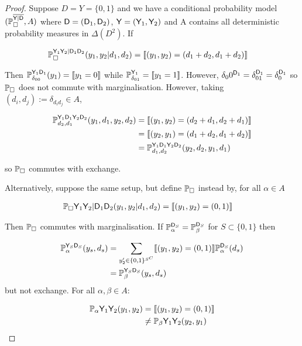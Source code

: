 \begin{proof}
Suppose $D=Y=\{0,1\}$ and we have a conditional probability model $(\mathbb{P}_\square^{\overline{\mathsf{Y}|\mathsf{D}}},A)$ where $\mathsf{D}=(\mathsf{D}_1,\mathsf{D}_2)$, $\mathsf{Y}=(\mathsf{Y}_1,\mathsf{Y}_2)$ and A contains all deterministic probability measures in $\Delta(D^2)$. If

\begin{align}
    \mathbb{P}_\square^{\mathsf{Y}_1\mathsf{Y}_2|\mathsf{D}_1\mathsf{D}_2}(y_1,y_2|d_1,d_2) &= \llbracket (y_1,y_2)= (d_1+d_2,d_1+d_2) \rrbracket
\end{align}

Then $\mathbb{P}_{\delta_{00}}^{\mathsf{Y}_1\mathsf{D}_1}(y_1) = \llbracket y_1=0\rrbracket$ while $\mathbb{P}_{\delta_{01}}^{\mathsf{Y}_1} = \llbracket y_1=1 \rrbracket$. However, $\delta_00^{\mathsf{D}_1}=\delta_{01}^{\mathsf{D}_1}=\delta_0^{\mathsf{D}_1}$ so $\mathbb{P}_\square$ does not commute with marginalisation. However, taking $(d_i,d_j):=\delta_{d_i d_j}\in A$,

\begin{align}
    \mathbb{P}_{d_2,d_1}^{\mathsf{Y}_1\mathsf{D}_1\mathsf{Y}_2\mathsf{D}_2}(y_1,d_1,y_2,d_2) &= \llbracket (y_1,y_2)= (d_2+d_1,d_2+d_1) \rrbracket\\
    &= \llbracket (y_2,y_1)= (d_1+d_2,d_1+d_2) \rrbracket\\
    &= \mathbb{P}_{d_1,d_2}^{\mathsf{Y}_1\mathsf{D}_1\mathsf{Y}_2\mathsf{D}_2}(y_2,d_2,y_1,d_1)
\end{align}

so $\mathbb{P}_\square$ commutes with exchange.

Alternatively, suppose the same setup, but define $\mathbb{P}_\square$ instead by, for all $\alpha\in A$

\begin{align}
    \mathbb{P}_\square{\ensuremath{\mathsf{Y}}_1\ensuremath{\mathsf{Y}}_2|\ensuremath{\mathsf{D}}_1\ensuremath{\mathsf{D}}_2}(y_1,y_2|d_1,d_2) &= \llbracket (y_1,y_2)= (0,1) \rrbracket
\end{align}

Then $\mathbb{P}_\square$ commutes with marginalisation. If $\mathbb{P}_\alpha^{\mathsf{D}_S}=\mathbb{P}_\beta^{\mathsf{D}_S}$ for $S\subset\{0,1\}$ then

\begin{align}
    \mathbb{P}_{\alpha}^{\mathsf{Y}_S\mathsf{D}_S}(y_s,d_s) &= \sum_{y'_2\in \{0,1\}^{S^C}} \llbracket (y_1,y_2)= (0,1) \rrbracket\mathbb{P}_\alpha^{\mathsf{D}_S}(d_s) \\
                                                  &= \mathbb{P}_{\beta}^{\mathsf{Y}_S\mathsf{D}_S}(y_s,d_s)
\end{align}
but not exchange. For all $\alpha,\beta \in A$:

\begin{align}
    \mathbb{P}_\alpha{\ensuremath{\mathsf{Y}}_1\ensuremath{\mathsf{Y}}_2}(y_1,y_2) &= \llbracket (y_1,y_2)= (0,1) \rrbracket\\
    &\neq \mathbb{P}_\beta{\ensuremath{\mathsf{Y}}_1\ensuremath{\mathsf{Y}}_2}(y_2,y_1)
\end{align}
\end{proof}

